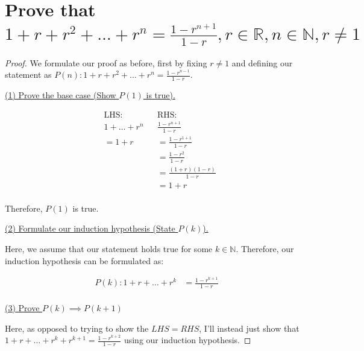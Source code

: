 \documentclass{article}
\begin{document}
\section[Example ~\thesection]{Prove that $1 + r + r^2 + \ldots + r^n = \frac{1 - r^{n + 1}}{1 - r}, r \in \mathbb{R}, n \in \mathbb{N}, r \ne 1$}

\begin{proof}

We formulate our proof as before, first by fixing $r \ne 1$ and defining our statement as $P(n): 1 + r + r^2 + \ldots + r^n = \frac{1 - r^{n - 1}}{1 - r}$. \\

\begin{center}
	\large{\underline{(1) Prove the base case (Show $P(1)$ is true).}}
\end{center}

\vspace{.3cm}

\begin{align*}
	&\text{LHS:}& &\text{RHS:} \\
	&1 + \ldots + r^n& &\frac{1 - r^{n + 1}}{1 - r} \\
	&=1 + r& &=\frac{1 - r^{1 + 1}}{1 - r} \\
	& & &=\frac{1 - r^{2}}{1 - r} \\
	& & &=\frac{(1 + r)(1 - r)}{1 - r} \\
	& & &=1 + r \\
\end{align*}

Therefore, $P(1)$ is true. \\

\begin{center}
	\large{\underline{(2) Formulate our induction hypothesis (State $P(k)$).}}
\end{center}

Here, we assume that our statement holds true for some $k \in \mathbb{N}$. Therefore, our induction hypothesis can be formulated as:

\begin{align*}
	P(k): 1 + r + \ldots + r^k &= \frac{1 - r^{k + 1}}{1 - r} \\
\end{align*}

\begin{center}
	\large{\underline{(3) Prove $P(k) \implies P(k + 1)$}}
\end{center}

Here, as opposed to trying to show the $LHS = RHS$, I'll instead just show that $1 + r + \ldots + r^k + r^{k + 1} = \frac{1 - r^{k + 2}}{1 - r}$ using our induction hypothesis.


\end{proof}
\end{document}
